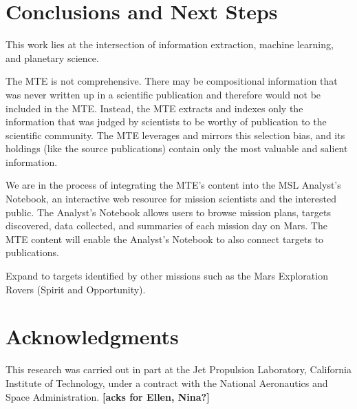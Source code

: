 \documentclass[letterpaper]{article} %
\begin{document}
\section{Conclusions and Next Steps}

This work lies at the intersection of information extraction, machine
learning, and planetary science.  

The MTE is not comprehensive.  There may be compositional information
that was never written up in a scientific publication and therefore
would not be included in the MTE.  Instead, the MTE extracts and
indexes only the information that was judged by scientists to be
worthy of publication to the scientific community.  The MTE leverages
and mirrors this selection bias, and its holdings (like the source
publications) contain only the most valuable and salient information.

We are in the process of integrating the MTE's content into the MSL
Analyst's Notebook, an interactive web resource for mission scientists
and the interested public.  The Analyst's Notebook allows users to
browse mission plans, targets discovered, data collected, and
summaries of each mission day on Mars.  The MTE content will enable
the Analyst's Notebook to also connect targets to publications.

Expand to targets identified by other missions such as the Mars
Exploration Rovers (Spirit and Opportunity).

\section{Acknowledgments}
This research was carried out in part at the Jet Propulsion Laboratory,
California Institute of Technology, under a contract with the National
Aeronautics and Space Administration.  {\bf [acks for Ellen, Nina?]}



\end{document}
